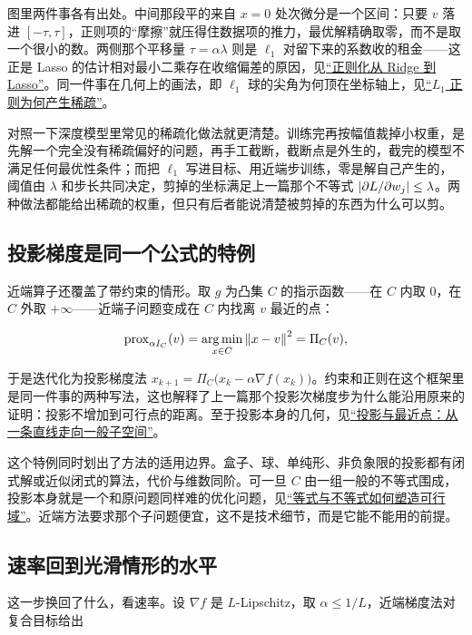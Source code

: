 图里两件事各有出处。中间那段平的来自 \(x=0\) 处次微分是一个区间：只要 \(v\) 落进 \([-\tau,\tau]\)，正则项的``摩擦''就压得住数据项的推力，最优解精确取零，而不是取一个很小的数。两侧那个平移量 \(\tau=\alpha\lambda\) 则是 \(\ell_1\) 对留下来的系数收的租金——这正是 Lasso 的估计相对最小二乘存在收缩偏差的原因，见\hyperref[sec:13-Machine-Learning/02-Linear-Models/02]{``正则化从 Ridge 到 Lasso''}。同一件事在几何上的画法，即 \(\ell_1\) 球的尖角为何顶在坐标轴上，见\hyperref[sec:09-Convex-Optimization/07-Applications/02]{``\(L_1\) 正则为何产生稀疏''}。

对照一下深度模型里常见的稀疏化做法就更清楚。训练完再按幅值裁掉小权重，是先解一个完全没有稀疏偏好的问题，再手工截断，截断点是外生的，截完的模型不满足任何最优性条件；而把 \(\ell_1\) 写进目标、用近端步训练，零是解自己产生的，阈值由 \(\lambda\) 和步长共同决定，剪掉的坐标满足上一篇那个不等式 \(\left|\partial L/\partial w_j\right|\le\lambda\)。两种做法都能给出稀疏的权重，但只有后者能说清楚被剪掉的东西为什么可以剪。

\subsection{投影梯度是同一个公式的特例}

近端算子还覆盖了带约束的情形。取 \(g\) 为凸集 \(C\) 的指示函数——在 \(C\) 内取 \(0\)，在 \(C\) 外取 \(+\infty\)——近端子问题变成在 \(C\) 内找离 \(v\) 最近的点：

\[
\operatorname{prox}_{\alpha I_C}(v)=\operatorname*{arg\,min}_{x\in C}\left\lVert x-v\right\rVert^2=\Pi_C(v),
\]

于是迭代化为投影梯度法 \(x_{k+1}=\Pi_C\bigl(x_k-\alpha\nabla f(x_k)\bigr)\)。约束和正则在这个框架里是同一件事的两种写法，这也解释了上一篇那个投影次梯度步为什么能沿用原来的证明：投影不增加到可行点的距离。至于投影本身的几何，见\hyperref[sec:03-Linear-Algebra/03-Orthogonality/02]{``投影与最近点：从一条直线走向一般子空间''}。

这个特例同时划出了方法的适用边界。盒子、球、单纯形、非负象限的投影都有闭式解或近似闭式的算法，代价与维数同阶。可一旦 \(C\) 由一组一般的不等式围成，投影本身就是一个和原问题同样难的优化问题，见\hyperref[sec:09-Convex-Optimization/02-Convex-Sets/02]{``等式与不等式如何塑造可行域''}。近端方法要求那个子问题便宜，这不是技术细节，而是它能不能用的前提。

\subsection{速率回到光滑情形的水平}

这一步换回了什么，看速率。设 \(\nabla f\) 是 \(L\)-Lipschitz，取 \(\alpha\le1/L\)，近端梯度法对复合目标给出

